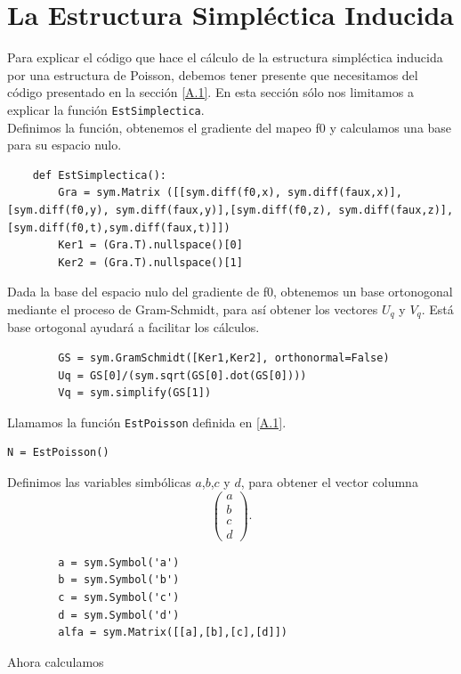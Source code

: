 \documentclass[a4paper,10pt]{book}
\begin{document}
\section{La Estructura Simpl\'ectica Inducida}\label{A.2}
Para explicar el c\'odigo que hace el c\'alculo de la estructura simpl\'ectica inducida por una estructura de Poisson, debemos tener presente que necesitamos del c\'odigo presentado en la secci\'on \ref{A.1}. En esta secci\'on s\'olo nos limitamos a explicar la funci\'on \texttt{EstSimplectica}.\\

Definimos la funci\'on, obtenemos el gradiente del mapeo f0 y calculamos una base para su espacio nulo.  
\lstset{stepnumber=0}
\begin{lstlisting}
    def EstSimplectica():
        Gra = sym.Matrix ([[sym.diff(f0,x), sym.diff(faux,x)],[sym.diff(f0,y), sym.diff(faux,y)],[sym.diff(f0,z), sym.diff(faux,z)],[sym.diff(f0,t),sym.diff(faux,t)]])
        Ker1 = (Gra.T).nullspace()[0]
        Ker2 = (Gra.T).nullspace()[1]
\end{lstlisting}
Dada la base del espacio nulo del gradiente de f0, obtenemos un base ortonogonal mediante el proceso de Gram-Schmidt, para as\'i obtener los vectores $U_{q}$ y $V_{q}$. Est\'a base ortogonal ayudar\'a a facilitar los c\'alculos.   
\lstset{stepnumber=0}
\begin{lstlisting}
        GS = sym.GramSchmidt([Ker1,Ker2], orthonormal=False)
        Uq = GS[0]/(sym.sqrt(GS[0].dot(GS[0])))
        Vq = sym.simplify(GS[1])  
\end{lstlisting}
Llamamos la funci\'on \texttt{EstPoisson} definida en \ref{A.1}.
\lstset{stepnumber=0}
\begin{lstlisting}
N = EstPoisson()
\end{lstlisting}
Definimos las variables simb\'olicas $a$,$b$,$c$ y $d$, para obtener el vector columna 
\[ \left( \begin{array}{c}
             a  \\
             b  \\
             c  \\
             d     
             \end{array}
   \right). \] 
\lstset{stepnumber=0}
\begin{lstlisting}
        a = sym.Symbol('a')
        b = sym.Symbol('b')
        c = sym.Symbol('c')
        d = sym.Symbol('d') 
        alfa = sym.Matrix([[a],[b],[c],[d]])
\end{lstlisting}
Ahora calculamos 
\end{document}

